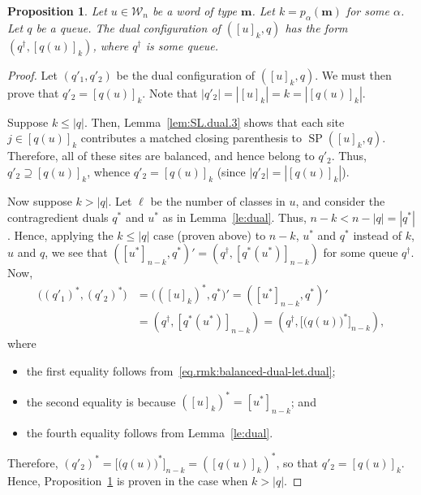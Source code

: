 \documentclass[reqno]{amsart}
\newcommand{\0}{\phantom{c}}
\DeclareMathOperator{\SP}{SP} %
\newcommand{\mm}{\mathbf{m}}
\newcommand{\mcW}{\mathcal{W}}
\newcommand{\abs}[1]{\left| #1 \right|}
\newcommand{\tup}[1]{\left( #1 \right)}
\newcommand{\ive}[1]{\left[ #1 \right]}
\theoremstyle{plain}
\newtheorem{prop}[thm]{Proposition}
\theoremstyle{definition}
\numberwithin{equation}{section}
\begin{document}
\begin{prop} \label{prop:SL.dual}
Let $u \in \mcW_n$ be a word of type $\mm$.
Let $k = p_{\alpha}(\mm)$ for some $\alpha$.
Let $q$ be a queue.
The dual configuration of $\tup{ [u]_k , q }$ has the form $\tup{q^{\dagger} , [q(u)]_k }$, where $q^{\dagger}$ is some queue.
\end{prop}

\begin{proof}
Let $\tup{q'_1, q'_2}$ be the dual configuration of $\tup{ [u]_k , q }$.
We must then prove that $q'_2 = \ive{q(u)}_k$.
Note that $\abs{q'_2} = \abs{\ive{u}_k} = k = \abs{\ive{q(u)}_k}$.

Suppose $k \leq \abs{q}$.
Then, Lemma~\ref{lem:SL.dual.3} shows that each site $j \in \ive{q(u)}_k$ contributes a matched closing parenthesis to $\SP(\ive{u}_k, q)$.
Therefore, all of these sites are balanced, and hence belong to $q'_2$.
Thus, $q'_2 \supseteq \ive{q(u)}_k$, whence $q'_2 = \ive{q(u)}_k$
(since $\abs{q'_2} = \abs{\ive{q(u)}_k}$).

Now suppose $k > \abs{q}$.
Let $\ell$ be the number of classes in $u$, and consider the contragredient duals $q^*$ and $u^*$ as in Lemma~\ref{le:dual}.
Thus, $n-k < n - \abs{q} = \abs{q^*}$.
Hence, applying the $k \leq \abs{q}$ case (proven above)
to $n-k$, $u^*$ and $q^*$ instead of $k$, $u$ and $q$,
we see that
$\tup{ [u^*]_{n-k} , q^* }' = \tup{ q^\dagger , [q^*(u^*)]_{n-k} }$
for some queue $q^\dagger$.
Now,
\begin{align*}
 \bigl( (q'_1)^*, (q'_2)^* \bigr)
 &= \bigl( ([u]_k)^* , q^* \bigr)'
 = \tup{ [u^*]_{n-k} , q^* }' \\
 & = \tup{ q^{\dagger} , [q^*(u^*)]_{n-k} }
 = \tup{ q^{\dagger} , \bigl[\bigl(q(u) \bigr)^* \bigr]_{n-k} } ,
\end{align*}
where
\begin{itemize}
 \item the first equality follows from~\eqref{eq.rmk:balanced-dual-let.dual};
 \item the second equality is because $([u]_k)^* = [u^*]_{n-k}$; and
 \item the fourth equality follows from Lemma~\ref{le:dual}.
\end{itemize}
Therefore, $(q'_2)^* = \bigl[\bigl( q(u) \bigr)^* \bigr]_{n-k} = ([q(u)]_k)^*$, so that
$q'_2 = [q(u)]_k$.
Hence, Proposition~\ref{prop:SL.dual} is proven in the case when $k > \abs{q}$.
\end{proof}
\end{document}
